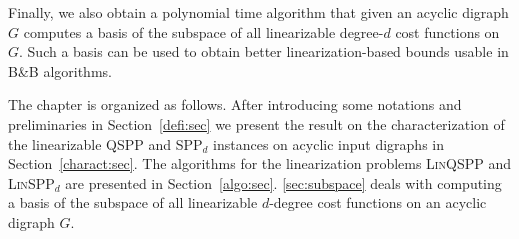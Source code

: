 Finally, we also obtain a polynomial time algorithm that given an acyclic digraph $G$ computes a basis of the subspace of all linearizable degree-$d$ cost functions on $G$. Such a basis can be used to obtain better linearization-based bounds usable in B\&B algorithms.
\smallskip

The chapter is organized as follows. 
After introducing some notations and preliminaries in Section~\ref{defi:sec} we present the result on the characterization of the linearizable QSPP and SPP$_d$ instances on acyclic input digraphs in Section~\ref{charact:sec}. The algorithms for the linearization problems \textsc{Lin}QSPP and \textsc{Lin}SPP$_d$ are presented in Section~\ref{algo:sec}. 
\cref{sec:subspace} deals with 
computing a basis of the subspace of all linearizable $d$-degree cost functions on an acyclic digraph $G$.

